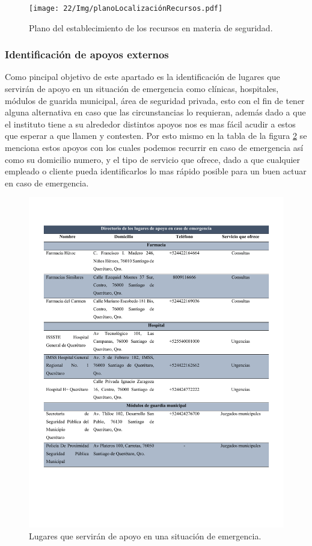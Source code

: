     \begin{figure}[H]
      \centering
      \texttt{[image: 22/Img/planoLocalizaciónRecursos.pdf]}
       \caption{Plano del establecimiento de los recursos en materia de seguridad.}
       \label{fig:PlanoLocalizaciónRecursos}
     \end{figure}
    
    \subsubsection{Identificación de apoyos externos}
    
    
    Como pincipal objetivo de este apartado es la identificación de lugares que servirán de apoyo en un situación de
    emergencia como clínicas, hospitales, módulos de guarida municipal, área de seguridad privada, esto con el fin de tener alguna alternativa en caso que las circunstancias lo requieran, además dado a que el instituto tiene a su alrededor distintos apoyos nos es mas fácil acudir a estos que esperar a que llamen y contesten. Por esto mismo en la tabla de la figura \ref{fig:apoyosExt} se menciona estos apoyos con los cuales podemos recurrir en caso de emergencia así como su domicilio numero, y el tipo de servicio que ofrece, dado a que cualquier empleado o cliente pueda identificarlos lo mas rápido posible para un buen actuar en caso de emergencia.
    
    
    \begin{figure}[H]
        \centering
        \includegraphics[trim = {1mm 45mm 10mm 15mm},clip,scale=0.35]{22/Img/apoyosExt.pdf}
        \caption{ Lugares que servirán de apoyo en una situación de emergencia.}
        \label{fig:apoyosExt}
    \end{figure}
    
